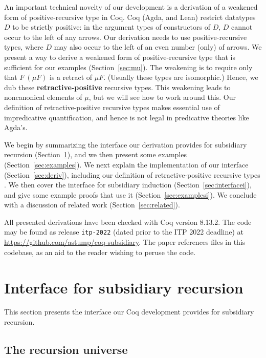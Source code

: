 \documentclass[a4paper,USenglish]{lipics-v2021}
\begin{document}
An important technical novelty of our development is a derivation of a
weakened form of positive-recursive type in Coq.  Coq (Agda, and Lean)
restrict datatypes $D$ to be strictly positive: in the argument types
of constructors of $D$, $D$ cannot occur to the left of any arrows.
Our derivation needs to use positive-recursive types, where $D$ may
also occur to the left of an even number (only) of arrows.  We present
a way to derive a weakened form of positive-recursive type that is
sufficient for our examples (Section~\ref{sec:mu}).  The weakening is
to require only that $F\ (\mu F)$ is a retract of $\mu F$.  (Usually
these types are isomorphic.)  Hence, we dub these
\textbf{retractive-positive} recursive types.  This weakening leads to
noncanonical elements of $\mu$, but we will see how to work around
this.  Our definition of retractive-positive recursive types makes
essential use of impredicative quantification, and hence is not legal
in predicative theories like Agda's.

We begin by summarizing the interface our derivation provides for
subsidiary recursion (Section~\ref{sec:interface}), and we then
present some examples (Section~\ref{sec:examples}).  We next explain
the implementation of our interface (Section~\ref{sec:deriv}),
including our definition of retractive-positive recursive types
.  We then cover the interface for subsidiary
induction (Section~\ref{sec:interfacei}), and give some example proofs
that use it (Section~\ref{sec:examplesi}). We conclude with a discussion
of related work (Section~\ref{sec:related}).

All presented derivations have been checked with Coq version 8.13.2.  The code may be
found as release \verb|itp-2022| (dated prior to the ITP 2022
deadline) at \url{https://github.com/astump/coq-subsidiary}.  The
paper references files in this codebase, as an aid to the reader
wishing to peruse the code.

\section{Interface for subsidiary recursion}
\label{sec:interface}

This section presents the interface our Coq development provides
for subsidiary recursion.

\subsection{The recursion universe}
\label{sec:recu}
\end{document}
